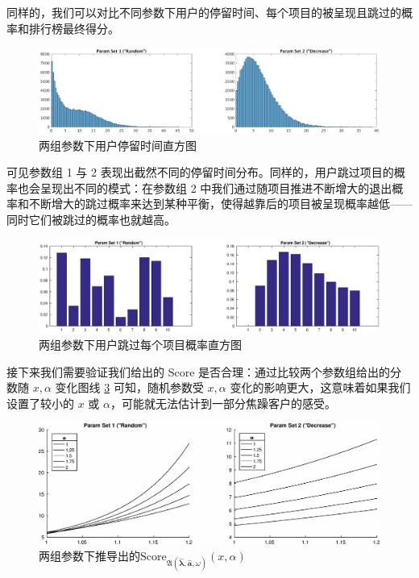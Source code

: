 \documentclass[UTF8]{ctexart}
\theoremstyle{plain}
\theoremstyle{definition}
\theoremstyle{remark}
\begin{document}
	同样的，我们可以对比不同参数下用户的停留时间、每个项目的被呈现且跳过的概率和排行榜最终得分。
	
	\begin{figure}[h!]
		\centering
		\includegraphics[width = \linewidth]{../model/meituan/pic/random-decrease-time-compare-M-100000.eps}
		\caption{两组参数下用户停留时间直方图}\label{fig:random-decrease-time-compare-M-100000}
	\end{figure}

	可见参数组 1 与 2 表现出截然不同的停留时间分布。同样的，用户跳过项目的概率也会呈现出不同的模式：在参数组 2 中我们通过随项目推进不断增大的退出概率和不断增大的跳过概率来达到某种平衡，使得越靠后的项目被呈现概率越低——同时它们被跳过的概率也就越高。

	\begin{figure}[h!]
		\centering
		\includegraphics[width = \linewidth]{../model/meituan/pic/random-decrease-skip-compare-M-100000.eps}
		\caption{两组参数下用户跳过每个项目概率直方图}\label{fig:random-decrease-skip-compare-M-100000}
	\end{figure}

	接下来我们需要验证我们给出的 Score 是否合理：通过比较两个参数组给出的分数随 $x, \alpha$ 变化图线 \ref{fig:random-decrease-score-compare-M-100000} 可知，随机参数受 $x, \alpha$ 变化的影响更大，这意味着如果我们设置了较小的 $x$ 或 $\alpha$，可能就无法估计到一部分焦躁客户的感受。
	
	\begin{figure}[h!]
		\centering
		\includegraphics[width = \linewidth]{../model/meituan/pic/random-decrease-score-compare-M-100000.eps}
		\caption{两组参数下推导出的$\mathrm{Score}_{\mathfrak{A}\left(\bm{\hat{\lambda}}, \bm{\hat{a}}, \omega\right)}(x, \alpha)$}\label{fig:random-decrease-score-compare-M-100000}
	\end{figure}
	
\end{document}
